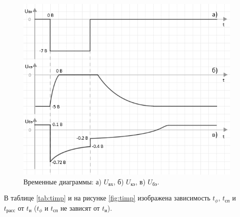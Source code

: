 \begin{figure}[H]
	\begin{center}
		\includegraphics[width=15cm]{img/time}
		\caption{Временные диаграммы: а) $U_\text{вх}$, б) $U_\text{кэ}$, в) $U_\text{бэ}$.}
		\label{fig:time}
	\end{center}
\end{figure}

В таблице \ref{tab:timp} и на рисунке \ref{fig:timp} изображена зависимость $t_\phi$, $t_\text{сп}$ и $t_\text{расс}$ от $t_\text{и}$ ($t_\phi$ и $t_\text{сп}$ не зависят от $t_\text{и}$).

